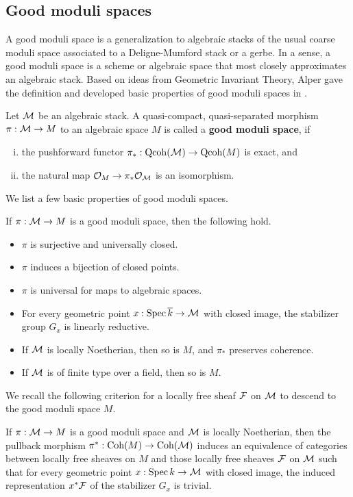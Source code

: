 \subsection{Good moduli spaces}
A good moduli space is a generalization to algebraic stacks of the usual coarse moduli space associated to a Deligne-Mumford stack or a gerbe. In a sense, a good moduli space is a scheme or algebraic space that most closely approximates an algebraic stack. Based on ideas from Geometric Invariant Theory, Alper gave the definition and developed basic properties of good moduli spaces in \cite{AlperGMS}.

Let $\mathcal{M}$ be an algebraic stack. A quasi-compact, quasi-separated morphism $\pi: \mathcal{M} \to M$ to an algebraic space $M$ is called a {\bf good moduli space}, if 
\begin{enumerate}[(i)]
    \item the pushforward functor $\pi_*: \operatorname{\mathrm{Qcoh}}(\mathcal{M}) \to \operatorname{\mathrm{Qcoh}}(M)$ is exact, and
    \item the natural map $\mathcal{O}_M \to \pi_*\mathcal{O}_{\mathcal{M}}$ is an isomorphism.
\end{enumerate}
We list a few basic properties of good moduli spaces.
\begin{prop}
    If $\pi: \mathcal{M} \to M$ is a good moduli space, then the following hold. \begin{itemize}
        \item $\pi$ is surjective and universally closed.
        \item $\pi$ induces a bijection of closed points.
        \item $\pi$ is universal for maps to algebraic spaces.
        \item For every geometric point $x: \operatorname{\mathrm{Spec}} \overline{k} \to \mathcal{M}$ with closed image, the stabilizer group $G_x$ is linearly reductive.
        \item If $\mathcal{M}$ is locally Noetherian, then so is $M$, and $\pi_*$ preserves coherence.
        \item If $\mathcal{M}$ is of finite type over a field, then so is $M$.
    \end{itemize}
\end{prop}

We recall the following criterion \cite[Theorem 10.3]{AlperGMS} for a locally free sheaf $\mathcal{F}$ on $\mathcal{M}$ to descend to the good moduli space $M$. 
\begin{prop}\label{vbtogms}
    If $\pi: \mathcal{M} \to M$ is a good moduli space and $\mathcal{M}$ is locally Noetherian, then the pullback morphism $\pi^*: \operatorname{\mathrm{Coh}}(M) \to \operatorname{\mathrm{Coh}}(\mathcal{M})$ induces an equivalence of categories between locally free sheaves on $M$ and those locally free sheaves $\mathcal{F}$ on $\mathcal{M}$ such that for every geometric point $x: \operatorname{\mathrm{Spec}} k \to \mathcal{M}$ with closed image, the induced representation $x^*\mathcal{F}$ of the stabilizer $G_x$ is trivial.
\end{prop}

